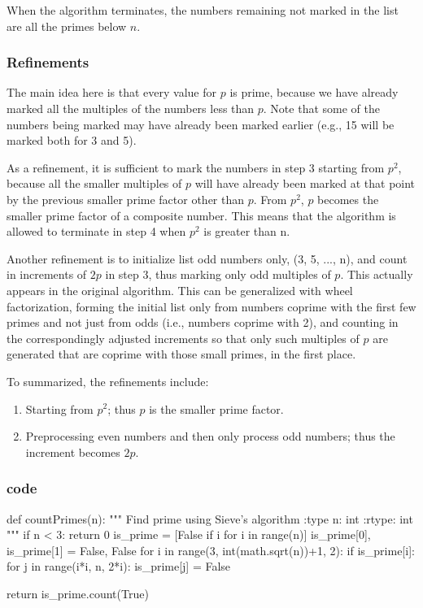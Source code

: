 When the algorithm terminates, the numbers remaining not marked in the list are all the primes below $n$.

\subsubsection{Refinements}
The main idea here is that every value for $p$ is prime, because we have already marked all the multiples of the numbers less than $p$. Note that some of the numbers being marked may have already been marked earlier (e.g., 15 will be marked both for 3 and 5).

As a refinement, it is sufficient to mark the numbers in step 3 starting from $p^2$, because all the smaller multiples of $p$ will have already been marked at that point by the previous smaller prime factor other than $p$. From $p^2$, $p$ becomes the smaller prime factor of a composite number. This means that the algorithm is allowed to terminate in step 4 when $p^2$ is greater than n.

Another refinement is to initialize list odd numbers only, (3, 5, ..., n), and count in increments of $2p$ in step 3, thus marking only odd multiples of $p$. This actually appears in the original algorithm. This can be generalized with wheel factorization, forming the initial list only from numbers coprime with the first few primes and not just from odds (i.e., numbers coprime with 2), and counting in the correspondingly adjusted increments so that only such multiples of $p$ are generated that are coprime with those small primes, in the first place.

To summarized, the refinements include:
\begin{enumerate}
\item Starting from $p^2$; thus $p$ is the smaller prime factor. 
\item Preprocessing even numbers and then only process odd numbers; thus the increment becomes $2p$.
\end{enumerate}

\subsubsection{code}
\begin{python}
def countPrimes(n):
    """
    Find prime using Sieve's algorithm
    :type n: int
    :rtype: int
    """
    if n < 3: return 0
    is_prime = [False if i%
                for i in range(n)]
    is_prime[0], is_prime[1] = False, False
    for i in range(3, int(math.sqrt(n))+1, 2):
        if is_prime[i]:
            for j in range(i*i, n, 2*i):
                is_prime[j] = False

    return is_prime.count(True)
\end{python}

